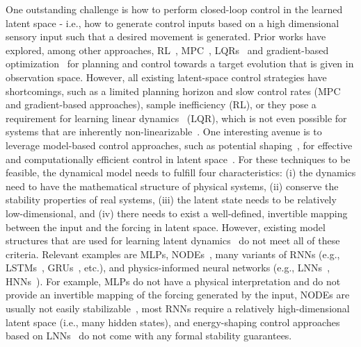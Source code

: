 One outstanding challenge is how to perform closed-loop control in the learned latent space - i.e., how to generate control inputs based on a high dimensional sensory input such that a desired movement is generated. Prior works have explored, among other approaches, \gls{RL}~\cite{van2016stable, gelada2019deepmdp, hafner2019dream, schwarting2021deep}, \gls{MPC}~\cite{lenz2015deepmpc, hafner2019learning, hewing2020learning, alora2023robust}, \glspl{LQR}~\cite{brunton2016koopman, mamakoukas2019local, haggerty2023control} and gradient-based optimization~\cite{yamada2023leveraging} for planning and control towards a target evolution that is given in observation space.
However, all existing latent-space control strategies have shortcomings, such as a limited planning horizon and slow control rates (\gls{MPC} and gradient-based approaches), sample inefficiency (RL), or they pose a requirement for learning linear dynamics~\cite{watter2015embed} (\gls{LQR}), which is not even possible for systems that are inherently non-linearizable~\cite{cenedese2022data}.
One interesting avenue is to leverage model-based control approaches, such as potential shaping~\cite{bloch2001controlled, ortega2021pid, zhong2020unsupervised}, for effective and computationally efficient control in latent space~\cite{lepri2023neural}. 
For these techniques to be feasible, the dynamical model needs to fulfill four characteristics: (i) the dynamics need to have the mathematical structure of physical systems, (ii) conserve the stability properties of real systems, (iii) the latent state needs to be relatively low-dimensional, and (iv) there needs to exist a well-defined, invertible mapping between the input and the forcing in latent space.
However, existing model structures that are used for learning latent dynamics~\cite{botev2021priors} do not meet all of these criteria. Relevant examples are \glspl{MLP}, \glspl{NODE}~\cite{chen2018neural, sholokhov2023physics}, many variants of \glspl{RNN} (e.g., LSTMs~\cite{hochreiter1997long}, \glspl{GRU}~\cite{cho2014learning}, etc.), and physics-informed neural networks (e.g., \glspl{LNN}~\cite{lutter2018deep, cranmer2020lagrangian, zhong2020unsupervised}, \glspl{HNN}~\cite{greydanus2019hamiltonian}). For example, \glspl{MLP} do not have a physical interpretation and do not provide an invertible mapping of the forcing generated by the input, \glspl{NODE} are usually not easily stabilizable~\cite{white2023stabilized}, most \glspl{RNN} require a relatively high-dimensional latent space (i.e., many hidden states), and energy-shaping control approaches based on \glspl{LNN}~\cite{zhong2020unsupervised} do not come with any formal stability guarantees. %

